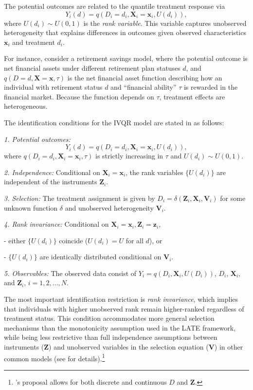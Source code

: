 The potential outcomes are related to the quantile treatment response via
\[
Y_i(d)=q(D_i=d_i,\mathbf{X}_i=\mathbf{x}_i,U(d_i)),
\]
where $U(d_i)\sim U(0,1)$ is the \textit{rank variable}. This variable captures unobserved heterogeneity that explains differences in outcomes given observed characteristics $\mathbf{x}_i$ and treatment $d_i$.  

For instance, consider a retirement savings model, where the potential outcome is net financial assets under different retirement plan statuses $d$, and $q(D=d,\mathbf{X}=\mathbf{x},\tau)$ is the net financial asset function describing how an individual with retirement status $d$ and ``financial ability'' $\tau$ is rewarded in the financial market. Because the function depends on $\tau$, treatment effects are heterogeneous.  

The identification conditions for the IVQR model are stated in \cite{Chernozhukov2005} as follows:

\textit{1. Potential outcomes:}  
\[
Y_i(d)=q(D_i=d_i,\mathbf{X}_i=\mathbf{x}_i,U(d_i)),
\]
where $q(D_i=d_i,\mathbf{X}_i=\mathbf{x}_i,\tau)$ is strictly increasing in $\tau$ and $U(d_i)\sim U(0,1)$.  

\textit{2. Independence:} Conditional on $\mathbf{X}_i=\mathbf{x}_i$, the rank variables $\{U(d_i)\}$ are independent of the instruments $\mathbf{Z}_i$.  

\textit{3. Selection:} The treatment assignment is given by $D_i=\delta(\mathbf{Z}_i,\mathbf{X}_i,\mathbf{V}_i)$ for some unknown function $\delta$ and unobserved heterogeneity $\mathbf{V}_i$.  

\textit{4. Rank invariance:} Conditional on $\mathbf{X}_i=\mathbf{x}_i,\mathbf{Z}_i=\mathbf{z}_i$,

- either $\{U(d_i)\}$ coincide ($U(d_i)=U$ for all $d$), or
  
- $\{U(d_i)\}$ are identically distributed conditional on $\mathbf{V}_i$.  

\textit{5. Observables:} The observed data consist of $Y_i=q(D_i,\mathbf{X}_i,U(D_i))$, $D_i$, $\mathbf{X}_i$, and $\mathbf{Z}_i$, $i=1,2,\dots,N$.  

The most important identification restriction is \textit{rank invariance}, which implies that individuals with higher unobserved rank remain higher-ranked regardless of treatment status. This condition accommodates more general selection mechanisms than the monotonicity assumption used in the LATE framework, while being less restrictive than full independence assumptions between instruments ($\mathbf{Z}$) and unobserved variables in the selection equation ($\mathbf{V}$) in other common models (see \cite{chernozhukov2004effects,Chernozhukov2005} for details).\footnote{\cite{Chernozhukov2005}'s proposal allows for both discrete and continuous $D$ and $\mathbf{Z}$.} 

